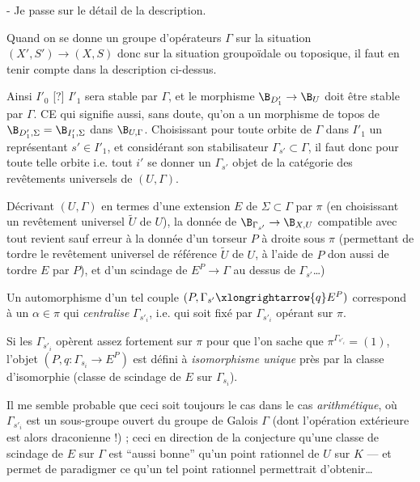 - Je passe sur le détail de la description.

Quand on se donne un groupe d'opérateurs $\Gamma$ sur la situation $(X', S') \to (X, S)$ donc sur la situation groupoïdale ou toposique, il faut en tenir compte dans la description ci-dessus.

Ainsi $I'_0$ [?] $I'_1$ sera stable par $\Gamma$, et le morphisme $\B_{D'_1} \to \B_U$ doit être stable par $\Gamma$. CE qui signifie aussi, sans doute, qu'on a un morphisme de topos de $\B_{D'_1, \Sigma} = \B_{I'_1, \Sigma}$ dans $\B_{U, \Gamma}$. Choisissant pour toute orbite de $\Gamma$ dans $I'_1$ un représentant $s' \in I'_1$, et considérant son stabilisateur $\Gamma_{s'} \subset  \Gamma$, il faut donc pour toute telle orbite i.e. tout $i'$ se donner un $\Gamma_{s'}$ objet de la catégorie des revêtements universels de $(U, \Gamma)$.

Décrivant $(U, \Gamma)$ en termes d'une extension $E$ de $\Sigma \subset  \Gamma$ par $\pi$ (en choisissant un revêtement universel $\widetilde{U}$ de $U$), la donnée de $\B_{\Gamma_{s'}} \to \B_{X, U}$ compatible avec tout revient sauf erreur à la donnée d'un torseur $P$ à droite sous $\pi$ (permettant de tordre le revêtement universel de référence $\widetilde{U}$ de $U$, à l'aide de $P$ don aussi de tordre $E$ par $P$), et d'un scindage de $E^P \to \Gamma$ au dessus de $\Gamma_{s'}$\dots)

Un automorphisme d'un tel couple $(P, \Gamma_{s'} \xlongrightarrow{q} E^P)$ correspond à un $\alpha \in \pi$ qui \emph{centralise} $\Gamma_{s'_i}$, i.e. qui soit fixé par $\Gamma_{s'_i}$ opérant sur $\pi$.

Si les $\Gamma_{s'_i}$ opèrent assez fortement sur $\pi$ pour que l'on sache que $\pi^{\Gamma_{s'_i}} = (1)$, l'objet $(P, q: \Gamma_{s_i} \to E^P)$ est défini à \emph{isomorphisme unique} près par la classe d'isomorphie (classe de scindage de $E$ sur $\Gamma_{s_i}$).

Il me semble probable que ceci soit toujours le cas dans le cas \emph{arithmétique}, où $\Gamma_{s'_i}$ est un sous-groupe ouvert du groupe de Galois $\Gamma$ (dont l'opération extérieure est alors draconienne !) ; ceci en direction de la conjecture qu'une classe de scindage de $E$ sur $\Gamma$ est ``aussi bonne'' qu'un point rationnel de $U$ sur $K$ --- et permet de paradigmer ce qu'un tel point rationnel permettrait d'obtenir\dots







